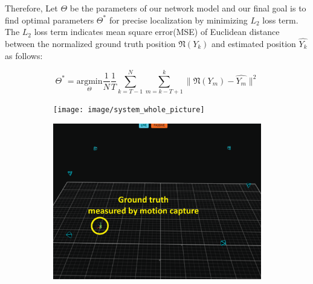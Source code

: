 \documentclass[letterpaper, 10 pt, conference]{ieeeconf}  %
\begin{document}
Therefore, Let $\Theta$ be the parameters of our network model and our final goal is to find optimal parameters $\Theta^{*}$ for precise localization by minimizing $L_2$ loss term. The $L_2$ loss term indicates mean square error(MSE) of Euclidean distance between the normalized ground truth position $\mathfrak{N}(Y_k)$ and estimated position $\hat{Y_k}$ as follows:

\begin{equation}
\Theta^{*} = \underset{\Theta}{\mathrm{argmin}} \frac{1}{N}\frac{1}{T} \sum_{k=T-1}^N\sum_{m=k-T+1}^k \parallel \mathfrak{N}(Y_m) - \hat{Y_m} \parallel^{2}
\end{equation}  

\begin{figure}[h]
	\centering
	\begin{subfigure}[b]{0.32\textwidth}
		\texttt{[image: image/system\_whole\_picture]}
		\caption{}
		\label{fig:whole_system}
	\end{subfigure}
	\begin{subfigure}[b]{0.32\textwidth}
		\includegraphics[width=\textwidth]{image/system_mocap}
		\caption{}
		\label{fig:Optitrack_figure}
	\end{subfigure}
	\begin{subfigure}[b]{0.32\textwidth}

\end{subfigure}
\end{figure}
\end{document}
